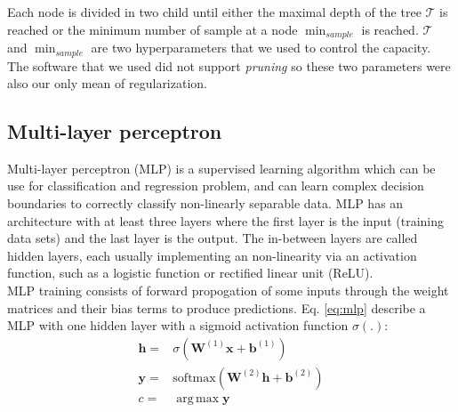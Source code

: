 \documentclass{article}
\newcommand{\softmax}{\mathrm{softmax}}
\DeclareMathOperator*{\argmax}{arg\,max}
\begin{document}
Each node is divided in two child until either the maximal depth of the tree $\mathcal{T}$ is reached or the minimum number of sample at a node $\min_{sample}$ is reached. $\mathcal{T}$ and $\min_{sample}$ are two hyperparameters that we used to control the capacity. The software that we used did not support \emph{pruning} so these two parameters were also our only mean of regularization. 

\subsection{Multi-layer perceptron} 
Multi-layer perceptron (MLP) is a supervised learning algorithm which can be use for classification and regression problem, and can learn complex decision boundaries to correctly classify non-linearly separable data. MLP has an architecture with at least three layers where the first layer is the input (training data sets) and the last layer is the output. The in-between layers are called hidden layers, each usually implementing an non-linearity via an activation function, such as a logistic function or rectified linear unit (ReLU).\\


MLP training consists of forward propogation of some inputs through the weight matrices and their bias terms to produce predictions. Eq. \ref{eq:mlp} describe a MLP with one hidden layer with a sigmoid activation function $\sigma(.)$:
\begin{equation}
    \begin{split}
        \mathbf{h} =& \sigma(\mathbf{W}^{(1)}\mathbf{x} + \mathbf{b}^{(1)})\\
        \mathbf{y} =& \softmax(\mathbf{W}^{(2)}\mathbf{h} + \mathbf{b}^{(2)})\\
        c =& \argmax \mathbf{y} 
    \end{split}
    \label{eq:mlp}
\end{equation}
\end{document}
